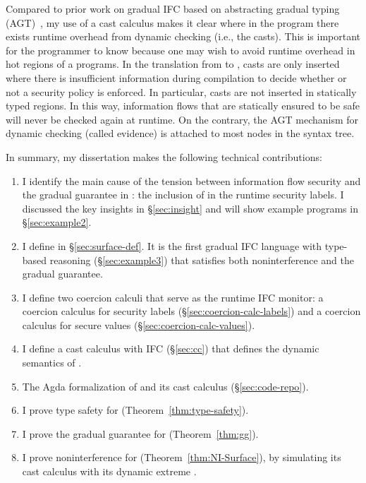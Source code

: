 Compared to prior work on gradual IFC based on abstracting gradual typing
(AGT)~\parencite{Toro:2018aa}, my use of a cast calculus makes it clear where in
the program there exists runtime overhead from dynamic checking (i.e., the
casts). This is important for the programmer to know because one may wish to
avoid runtime overhead in hot regions of a programs. In the translation from
\Surface to \CC, casts are only inserted where there is insufficient information
during compilation to decide whether or not a security policy is enforced. In
particular, casts are not inserted in statically typed regions. In this way,
information flows that are statically ensured to be safe will never be checked
again at runtime. On the contrary, the AGT mechanism for dynamic checking
(called evidence) is attached to most nodes in the syntax tree.


In summary, my dissertation makes the following technical contributions:

\begin{enumerate}
\item I identify the main cause of the tension between information flow security
  and the gradual guarantee in \GSLRef: the inclusion of \unk in the runtime
  security labels. I discussed the key insights in \S\ref{sec:insight} and will
  show example programs in \S\ref{sec:example2}.
\item I define \Surface in \S\ref{sec:surface-def}. It is the first gradual IFC
  language with type-based reasoning (\S\ref{sec:example3}) that satisfies both
  noninterference and the gradual guarantee.
\item I define two coercion calculi that serve as the runtime IFC monitor: a
  coercion calculus for security labels (\S\ref{sec:coercion-calc-labels}) and a
  coercion calculus for secure values (\S\ref{sec:coercion-calc-values}).
\item I define a cast calculus \CC with IFC (\S\ref{sec:cc}) that defines the
  dynamic semantics of \Surface.
\item The Agda formalization of \Surface and its cast calculus \CC
  (\S\ref{sec:code-repo}).
\item I prove type safety for \Surface (Theorem~\ref{thm:type-safety}).
\item I prove the gradual guarantee for \Surface (Theorem~\ref{thm:gg}).
\item I prove noninterference for \Surface (Theorem~\ref{thm:NI-Surface}), by
  simulating its cast calculus \CC with its dynamic extreme \DynIFC.
\end{enumerate}

